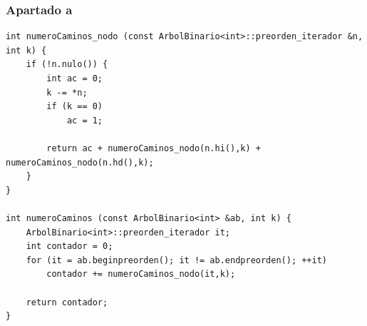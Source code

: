 \documentclass[10pt,a4paper,spanish]{report}
\begin{document}
\subsubsection{\textcolor[rgb]{0.5,0.8,1}Apartado a}
\begin{verbatim}
int numeroCaminos_nodo (const ArbolBinario<int>::preorden_iterador &n, int k) {
    if (!n.nulo()) {
        int ac = 0;
        k -= *n;
        if (k == 0)
            ac = 1;

        return ac + numeroCaminos_nodo(n.hi(),k) + numeroCaminos_nodo(n.hd(),k);
    }
}

int numeroCaminos (const ArbolBinario<int> &ab, int k) {
    ArbolBinario<int>::preorden_iterador it;
    int contador = 0;
    for (it = ab.beginpreorden(); it != ab.endpreorden(); ++it)
        contador += numeroCaminos_nodo(it,k);

    return contador;
}
\end{verbatim}
\end{document}
